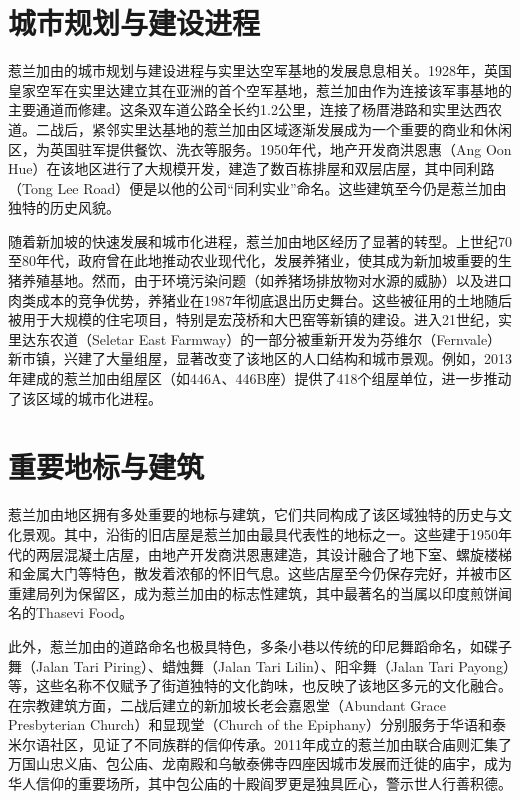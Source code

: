 \documentclass[11pt,a4paper,twoside,openany]{book}
\begin{document}
\section{城市规划与建设进程}
惹兰加由的城市规划与建设进程与实里达空军基地的发展息息相关。1928年，英国皇家空军在实里达建立其在亚洲的首个空军基地，惹兰加由作为连接该军事基地的主要通道而修建。这条双车道公路全长约1.2公里，连接了杨厝港路和实里达西农道。二战后，紧邻实里达基地的惹兰加由区域逐渐发展成为一个重要的商业和休闲区，为英国驻军提供餐饮、洗衣等服务。1950年代，地产开发商洪恩惠（Ang Oon Hue）在该地区进行了大规模开发，建造了数百栋排屋和双层店屋，其中同利路（Tong Lee Road）便是以他的公司“同利实业”命名。这些建筑至今仍是惹兰加由独特的历史风貌。

随着新加坡的快速发展和城市化进程，惹兰加由地区经历了显著的转型。上世纪70至80年代，政府曾在此地推动农业现代化，发展养猪业，使其成为新加坡重要的生猪养殖基地。然而，由于环境污染问题（如养猪场排放物对水源的威胁）以及进口肉类成本的竞争优势，养猪业在1987年彻底退出历史舞台。这些被征用的土地随后被用于大规模的住宅项目，特别是宏茂桥和大巴窑等新镇的建设。进入21世纪，实里达东农道（Seletar East Farmway）的一部分被重新开发为芬维尔（Fernvale）新市镇，兴建了大量组屋，显著改变了该地区的人口结构和城市景观。例如，2013年建成的惹兰加由组屋区（如446A、446B座）提供了418个组屋单位，进一步推动了该区域的城市化进程。

\section{重要地标与建筑}
惹兰加由地区拥有多处重要的地标与建筑，它们共同构成了该区域独特的历史与文化景观。其中，沿街的旧店屋是惹兰加由最具代表性的地标之一。这些建于1950年代的两层混凝土店屋，由地产开发商洪恩惠建造，其设计融合了地下室、螺旋楼梯和金属大门等特色，散发着浓郁的怀旧气息。这些店屋至今仍保存完好，并被市区重建局列为保留区，成为惹兰加由的标志性建筑，其中最著名的当属以印度煎饼闻名的Thasevi Food。

此外，惹兰加由的道路命名也极具特色，多条小巷以传统的印尼舞蹈命名，如碟子舞（Jalan Tari Piring）、蜡烛舞（Jalan Tari Lilin）、阳伞舞（Jalan Tari Payong）等，这些名称不仅赋予了街道独特的文化韵味，也反映了该地区多元的文化融合。在宗教建筑方面，二战后建立的新加坡长老会嘉恩堂（Abundant Grace Presbyterian Church）和显现堂（Church of the Epiphany）分别服务于华语和泰米尔语社区，见证了不同族群的信仰传承。2011年成立的惹兰加由联合庙则汇集了万国山忠义庙、包公庙、龙南殿和乌敏泰佛寺四座因城市发展而迁徙的庙宇，成为华人信仰的重要场所，其中包公庙的十殿阎罗更是独具匠心，警示世人行善积德。
\end{document}
